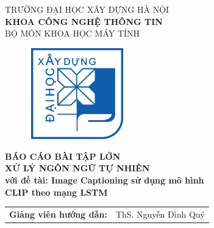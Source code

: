 \documentclass[main.tex]{subfiles}
\begin{document}
\begin{titlepage}

\begin{center}
\vspace{-8pt} {\fontsize{16pt}{0pt}\selectfont TRƯỜNG ĐẠI HỌC XÂY DỰNG HÀ NỘI} \\
\vspace{0.1cm}
\textbf{\fontsize{16pt}{0pt}\selectfont KHOA CÔNG NGHỆ THÔNG TIN}\\
\vspace{0.1cm}
{\fontsize{16pt}{0pt}\selectfont BỘ MÔN KHOA HỌC MÁY TÍNH}\\

\vspace{1cm}
 \begin{figure}[H]
     \centering
     \includegraphics[width=41.56mm, height=39.55mm]{Image/logodhxd.png}
 \end{figure}

\vspace{1cm}
\textbf{\fontsize{25pt}{0pt}\selectfont BÁO CÁO BÀI TẬP LỚN\\XỬ LÝ NGÔN NGỮ TỰ NHIÊN}\\[1cm]
\textbf{\fontsize{20pt}{0pt}\selectfont với đề tài: Image Captioning sử dụng mô hình\\CLIP theo mạng LSTM}\\[1cm]
\vspace{0.3cm}

\begin{table}[H]
\centering
\begin{tabular}{l l}
{\textbf{\fontsize{16pt}{0pt}\selectfont Giảng viên hướng dẫn:}} & {\fontsize{16pt}{0pt}\selectfont ThS. Nguyễn Đình Quý}\vspace{10pt}\\


\end{tabular}
\end{table}
\end{center}
\end{titlepage}
\end{document}
